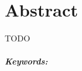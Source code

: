 

\begingroup
\let\clearpage\relax
\let\cleardoublepage\relax
\let\cleardoublepage\relax

\chapter*{Abstract} %

TODO

\endgroup			

\paragraph{Keywords:}\mbox{}\\
\textit{\myKeywords}

\vfill
